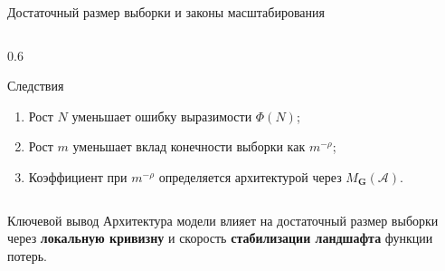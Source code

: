 \documentclass[aspectratio=169]{beamer}
\begin{document}
\begin{frame}{Достаточный размер выборки и законы масштабирования}
\begin{columns}[T]
\begin{column}{0.6\textwidth}
\begin{block}{Следствия}
            \begin{enumerate}
                \item Рост $N$ уменьшает ошибку выразимости $\Phi(N)$;
                \item Рост $m$ уменьшает вклад конечности выборки как $m^{-\rho}$;
                \item Коэффициент при $m^{-\rho}$ определяется архитектурой через $M_{\mathbf G}(\mathcal A)$.
            \end{enumerate}
        \end{block}
    \end{column}
\end{columns}
\begin{block}{Ключевой вывод}
    Архитектура модели влияет на достаточный размер выборки через \alert{\textbf{локальную кривизну}} и скорость \alert{\textbf{стабилизации ландшафта}} функции потерь.
\end{block}
\end{frame}
\end{document}
